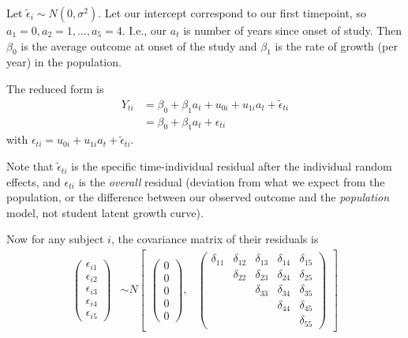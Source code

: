 \documentclass[
  letterpaper,
  DIV=11,
  numbers=noendperiod]{scrreprt}
\begin{document}
Let \(\tilde{\epsilon}_i \sim N(0, \sigma^2)\). Let our intercept
correspond to our first timepoint, so
\(a_1 = 0, a_2 = 1, ..., a_5 = 4\). I.e., our \(a_t\) is number of years
since onset of study. Then \(\beta_{0}\) is the average outcome at onset
of the study and \(\beta_{1}\) is the rate of growth (per year) in the
population.

The reduced form is \[\begin{aligned}
 Y_{ti} &= \beta_{0}  + \beta_{1}  a_t  + u_{0i} + u_{1i} a_t + \tilde{\epsilon}_{ti} \\ 
 &= \beta_{0}  + \beta_{1}  a_t  + \epsilon_{ti} 
\end{aligned}\] with
\(\epsilon_{ti} = u_{0i} + u_{1i} a_t + \tilde{\epsilon}_{ti}\).

Note that \(\tilde{\epsilon}_{ti}\) is the specific time-individual
residual after the individual random effects, and \(\epsilon_{ti}\) is
the \emph{overall} residual (deviation from what we expect from the
population, or the difference between our observed outcome and the
\emph{population} model, not student latent growth curve).

Now for any subject \(i\), the covariance matrix of their residuals is
\[\begin{aligned}
\begin{pmatrix} \epsilon_{i1} \\
\epsilon_{i2} \\
\epsilon_{i3} \\
\epsilon_{i4} \\
\epsilon_{i5}
\end{pmatrix} &\sim  N
\begin{bmatrix}
\begin{pmatrix}
0 \\
0 \\
0\\
0 \\
0
\end{pmatrix}\!\!,&
\begin{pmatrix}
\delta_{11} & \delta_{12} & \delta_{13} & \delta_{14} & \delta_{15} \\
           & \delta_{22} & \delta_{23} & \delta_{24} & \delta_{25} \\
         &              & \delta_{33} & \delta_{34} & \delta_{35} \\
         &              &             & \delta_{44} & \delta_{45} \\
         &              &              &            & \delta_{55} 
\end{pmatrix}
\end{bmatrix}
\end{aligned}\]
\end{document}
